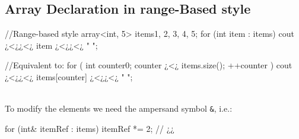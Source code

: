 \subsection{Array Declaration in range-Based style}
\begin{minipage}{\MPWxXSSxLISTING\textwidth} %
\vspace{-0.35cm}
\begin{CPPCode}
//Range-based style
array<int, 5> items{1, 2, 3, 4, 5};
for (int item : items)
{
    cout ¿<¿¿<¿ item ¿<¿¿<¿ " ";
}
\end{CPPCode}
\end{minipage}
\begin{minipage}{\MPWxXSxLISTING\textwidth} %
{} %
\begin{CPPCode}
//Equivalent to:
for ( int counter{0}; 
             counter ¿<¿ items.size(); 
          ++counter )
{
    cout ¿<¿¿<¿ items[counter] ¿<¿¿<¿ " ";
}
\end{CPPCode}
\end{minipage}
\\
\noindent To modify the elements we need the ampersand symbol \texttt{\&}, i.e.:\\
\begin{minipage}{\MPWxLARGExLISTING\textwidth} %
{} %
\begin{CPPCode}
for (int& itemRef : items)
{
    itemRef *= 2;    // ¿¿
}
\end{CPPCode}
\end{minipage}

